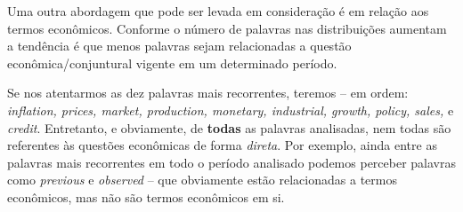 Uma outra abordagem que pode ser levada em consideração é em relação aos termos econômicos. Conforme o número de palavras nas distribuições aumentam a tendência é que menos palavras sejam relacionadas a questão econômica/conjuntural vigente em um determinado período.

Se nos atentarmos as dez palavras mais recorrentes, teremos -- em ordem: \textit{inflation, prices, market, production, monetary, industrial, growth, policy, sales,} e \textit{credit}. Entretanto, e obviamente, de \textbf{todas} as palavras analisadas, nem todas são referentes às questões econômicas de forma \textit{direta}. Por exemplo, ainda entre as palavras mais recorrentes em todo o período analisado podemos perceber palavras como \textit{previous} e \textit{observed} -- que obviamente estão relacionadas a termos econômicos, mas não são termos econômicos em si. 
\newpage

